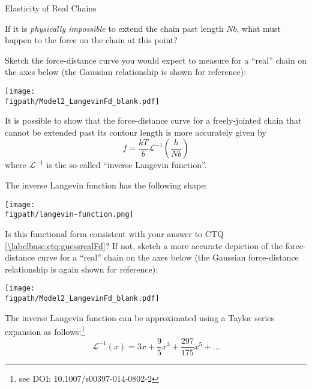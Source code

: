 \begin{activity}[extension]{Elasticity of Real Chains}
\begin{model}
	
\end{model}

\begin{ctqs}
	
	\question If it is \textit{physically impossible} to extend the chain past length $Nb$, what must happen to the force on the chain at this point?
	
		\begin{solution}[1in]
		\end{solution}
	
	\question Sketch the force-distance curve you would expect to measure for a ``real'' chain on the axes below (the Gaussian relationship is shown for reference): \label{\labelbase:ctq:guessrealFd}
		
		\centerline{\texttt{[image: \\figpath/Model2\_LangevinFd\_blank.pdf]}}
	
\end{ctqs}

\begin{infobox}

	It is possible to show %
	that the force-distance curve for a freely-jointed chain that cannot be extended past its contour length is more accurately given by
	\begin{equation*}
		f = \frac{kT}{b} \mathcal{L}^{-1}\left(\frac{h}{Nb}\right) \label{\labelbase:eqn:Fdlangevin}
	\end{equation*}
	where $\mathcal{L}^{-1}$ is the so-called ``inverse Langevin function''.
	
	The inverse Langevin function has the following shape:
	
	\centerline{\texttt{[image: \\figpath/langevin-function.png]}}
	
\end{infobox}

\begin{ctqs}
	
	\question Is this functional form consistent with your answer to CTQ \ref{\labelbase:ctq:guessrealFd}?  If not, sketch a more accurate depiction of the force-distance curve for a ``real'' chain on the axes below (the Gaussian force-distance relationship is again shown for reference):
		
		\centerline{\texttt{[image: \\figpath/Model2\_LangevinFd\_blank.pdf]}}	
	
	\question The inverse Langevin function can be approximated using a Taylor series expansion as follows:\footnote{see DOI: 10.1007/s00397-014-0802-2}
		\begin{equation*}
			\mathcal{L}^{-1}(x) = 3x + \frac{9}{5}x^3 + \frac{297}{175}x^5 + \dots
		\end{equation*}
		

\end{ctqs}
\end{activity}
